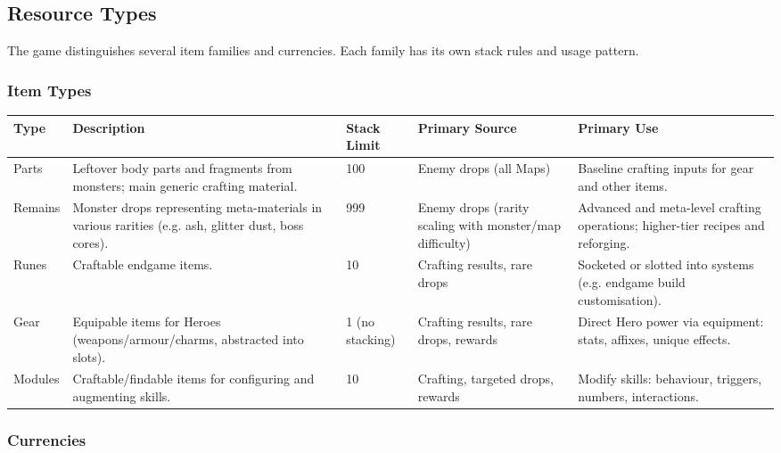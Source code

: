 \subsection{Resource Types}

The game distinguishes several item families and currencies. Each family has its own stack rules and usage pattern.

\subsubsection*{Item Types}

\begin{center}
	\begin{tabular}{p{2cm}p{4cm}p{2cm}p{3.5cm}p{4cm}}
		\textbf{Type} & \textbf{Description} & \textbf{Stack Limit} & \textbf{Primary Source} & \textbf{Primary Use} \\
		\hline
		Parts &
		Leftover body parts and fragments from monsters; main generic crafting material. &
		100 &
		Enemy drops (all Maps) &
		Baseline crafting inputs for gear and other items. \\
		\hline
		Remains &
		Monster drops representing meta-materials in various rarities (e.g. ash, glitter dust, boss cores). &
		999 &
		Enemy drops (rarity scaling with monster/map difficulty) &
		Advanced and meta-level crafting operations; higher-tier recipes and reforging. \\
		\hline
		Runes &
		Craftable endgame items. &
		10 &
		Crafting results, rare drops &
		Socketed or slotted into systems (e.g. endgame build customisation). \\
		\hline
		Gear &
		Equipable items for Heroes (weapons/armour/charms, abstracted into slots). &
		1 (no stacking) &
		Crafting results, rare drops, rewards &
		Direct Hero power via equipment: stats, affixes, unique effects. \\
		\hline
		Modules &
		Craftable/findable items for configuring and augmenting skills. &
		10 &
		Crafting, targeted drops, rewards &
		Modify skills: behaviour, triggers, numbers, interactions. \\
	\end{tabular}
	\label{tab:item-types}
\end{center}

\subsubsection*{Currencies}

